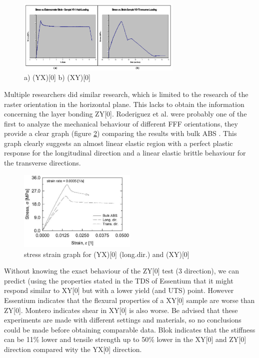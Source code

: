 \begin{figure}[H]
    \centering
    \includegraphics[width=0.7\textwidth]{chapter_2/figures/Transverseraster.PNG}
    \caption{a) (YX)[0] b) (XY)[0] \cite{Montero2001MaterialExperiments}}
    \label{fig:Transverseraster}
\end{figure}

Multiple researchers did similar research, which is limited to the research of the raster orientation in the horizontal plane. This lacks to obtain the information concerning the layer bonding ZY[0]. Roderiguez et al. were probably one of the first to analyze the mechanical behaviour of different FFF orientations, they provide a clear graph (figure \ref{fig:Rodriguezgraph}) comparing the results with bulk ABS \cite{Rodriguez2001MechanicalInvestigation}. This graph clearly suggests an almost linear elastic region with a perfect plastic response for the longitudinal direction and a linear elastic brittle behaviour for the transverse directions. 

\begin{figure}[H]
    \centering
    \includegraphics[width=0.5\textwidth]{chapter_2/figures/Rodriguezgraph.jpg}
    \caption{stress strain graph for (YX)[0] (long.dir.) and (XY)[0] \cite{Rodriguez2001MechanicalInvestigation}}
    \label{fig:Rodriguezgraph}
\end{figure}

Without knowing the exact behaviour of the ZY[0] test (3 direction), we can predict (using the properties stated in the TDS of Essentium \cite{TDSEssentium} that it might respond similar to XY[0] but with a lower yield (and UTS) point. However Essentium indicates that the flexural properties of a XY[0] sample are worse than ZY[0]. Montero indicates shear in XY[0] is also worse. Be advised that these experiments are made with different settings and materials, so no conclusions could be made before obtaining comparable data. Blok \cite{Blok2018AnComposites} indicates that the stiffness can be 11\% lower and tensile strength up to 50\% lower in the XY[0] and ZY[0] direction compared wity the YX[0] direction. 


